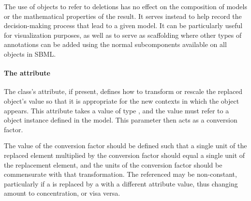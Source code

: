 The use of \ReplacedElement objects to refer to deletions has no effect
on the composition of models or the mathematical properties of the
result.  It serves instead to help record the decision-making process
that lead to a given model.  It can be particularly useful for
visualization purposes, as well as to serve as scaffolding where other
types of annotations can be added using the normal \Annotation
subcomponents available on all \SBase objects in SBML.

%


\paragraph{The \fixttspace{} attribute}
\label{replacedelement-conversionfactor}

The \ReplacedElement class's  attribute, if
present, defines how to transform or rescale the replaced object's value
so that it is appropriate for the new contexts in which the object
appears.  This attribute takes a value of type , and
the value must refer to a \Parameter object instance defined in the
model.  This parameter then acts as a conversion factor.

The value of the conversion factor should be defined such that a single
unit of the replaced element multiplied by the conversion factor should
equal a single unit of the replacement element, and the units of the
conversion factor should be commensurate with that transformation.  The
referenced \Parameter may be non-constant, particularly if a \Species is
replaced by a \Species with a different 
attribute value, thus changing amount to concentration, or visa versa.

